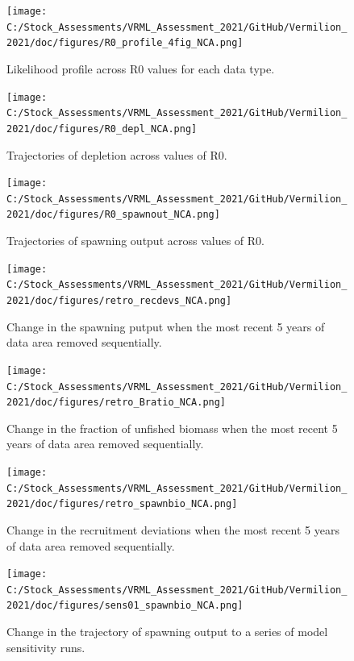 \documentclass[
  english,
  a4paper,
]{article}
\begin{document}
\begin{figure}
\centering
\texttt{[image: C:/Stock\_Assessments/VRML\_Assessment\_2021/GitHub/Vermilion\_2021/doc/figures/R0\_profile\_4fig\_NCA.png]}
\caption{Likelihood profile across R0 values for each data type.\label{fig:r0-profile}}
\end{figure}

\begin{figure}
\centering
\texttt{[image: C:/Stock\_Assessments/VRML\_Assessment\_2021/GitHub/Vermilion\_2021/doc/figures/R0\_depl\_NCA.png]}
\caption{Trajectories of depletion across values of R0.\label{fig:r0-depl}}
\end{figure}

\begin{figure}
\centering
\texttt{[image: C:/Stock\_Assessments/VRML\_Assessment\_2021/GitHub/Vermilion\_2021/doc/figures/R0\_spawnout\_NCA.png]}
\caption{Trajectories of spawning output across values of R0.\label{fig:r0-spawn}}
\end{figure}

\begin{figure}
\centering
\texttt{[image: C:/Stock\_Assessments/VRML\_Assessment\_2021/GitHub/Vermilion\_2021/doc/figures/retro\_recdevs\_NCA.png]}
\caption{Change in the spawning putput when the most recent 5 years of data area removed sequentially.\label{fig:retro-spawnb}}
\end{figure}

\begin{figure}
\centering
\texttt{[image: C:/Stock\_Assessments/VRML\_Assessment\_2021/GitHub/Vermilion\_2021/doc/figures/retro\_Bratio\_NCA.png]}
\caption{Change in the fraction of unfished biomass when the most recent 5 years of data area removed sequentially.\label{fig:retro-bratio}}
\end{figure}

\begin{figure}
\centering
\texttt{[image: C:/Stock\_Assessments/VRML\_Assessment\_2021/GitHub/Vermilion\_2021/doc/figures/retro\_spawnbio\_NCA.png]}
\caption{Change in the recruitment deviations when the most recent 5 years of data area removed sequentially.\label{fig:retro-recdev}}
\end{figure}

\begin{figure}
\centering
\texttt{[image: C:/Stock\_Assessments/VRML\_Assessment\_2021/GitHub/Vermilion\_2021/doc/figures/sens01\_spawnbio\_NCA.png]}
\caption{Change in the trajectory of spawning output to a series of model sensitivity runs.\label{fig:sens1-spawnb}}
\end{figure}
\end{document}
